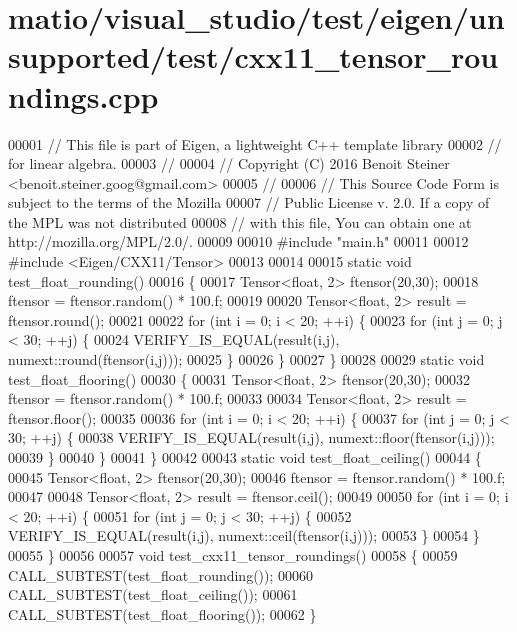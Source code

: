 \hypertarget{matio_2visual__studio_2test_2eigen_2unsupported_2test_2cxx11__tensor__roundings_8cpp_source}{}\section{matio/visual\+\_\+studio/test/eigen/unsupported/test/cxx11\+\_\+tensor\+\_\+roundings.cpp}
\label{matio_2visual__studio_2test_2eigen_2unsupported_2test_2cxx11__tensor__roundings_8cpp_source}

\begin{DoxyCode}
00001 \textcolor{comment}{// This file is part of Eigen, a lightweight C++ template library}
00002 \textcolor{comment}{// for linear algebra.}
00003 \textcolor{comment}{//}
00004 \textcolor{comment}{// Copyright (C) 2016 Benoit Steiner <benoit.steiner.goog@gmail.com>}
00005 \textcolor{comment}{//}
00006 \textcolor{comment}{// This Source Code Form is subject to the terms of the Mozilla}
00007 \textcolor{comment}{// Public License v. 2.0. If a copy of the MPL was not distributed}
00008 \textcolor{comment}{// with this file, You can obtain one at http://mozilla.org/MPL/2.0/.}
00009 
00010 \textcolor{preprocessor}{#include "main.h"}
00011 
00012 \textcolor{preprocessor}{#include <Eigen/CXX11/Tensor>}
00013 
00014 
00015 \textcolor{keyword}{static} \textcolor{keywordtype}{void} test\_float\_rounding()
00016 \{
00017   Tensor<float, 2> ftensor(20,30);
00018   ftensor = ftensor.random() * 100.f;
00019 
00020   Tensor<float, 2> result = ftensor.round();
00021 
00022   \textcolor{keywordflow}{for} (\textcolor{keywordtype}{int} i = 0; i < 20; ++i) \{
00023     \textcolor{keywordflow}{for} (\textcolor{keywordtype}{int} j = 0; j < 30; ++j) \{
00024       VERIFY\_IS\_EQUAL(result(i,j), numext::round(ftensor(i,j)));
00025     \}
00026   \}
00027 \}
00028 
00029 \textcolor{keyword}{static} \textcolor{keywordtype}{void} test\_float\_flooring()
00030 \{
00031   Tensor<float, 2> ftensor(20,30);
00032   ftensor = ftensor.random() * 100.f;
00033 
00034   Tensor<float, 2> result = ftensor.floor();
00035 
00036   \textcolor{keywordflow}{for} (\textcolor{keywordtype}{int} i = 0; i < 20; ++i) \{
00037     \textcolor{keywordflow}{for} (\textcolor{keywordtype}{int} j = 0; j < 30; ++j) \{
00038       VERIFY\_IS\_EQUAL(result(i,j), numext::floor(ftensor(i,j)));
00039     \}
00040   \}
00041 \}
00042 
00043 \textcolor{keyword}{static} \textcolor{keywordtype}{void} test\_float\_ceiling()
00044 \{
00045   Tensor<float, 2> ftensor(20,30);
00046   ftensor = ftensor.random() * 100.f;
00047 
00048   Tensor<float, 2> result = ftensor.ceil();
00049 
00050   \textcolor{keywordflow}{for} (\textcolor{keywordtype}{int} i = 0; i < 20; ++i) \{
00051     \textcolor{keywordflow}{for} (\textcolor{keywordtype}{int} j = 0; j < 30; ++j) \{
00052       VERIFY\_IS\_EQUAL(result(i,j), numext::ceil(ftensor(i,j)));
00053     \}
00054   \}
00055 \}
00056 
00057 \textcolor{keywordtype}{void} test\_cxx11\_tensor\_roundings()
00058 \{
00059    CALL\_SUBTEST(test\_float\_rounding());
00060    CALL\_SUBTEST(test\_float\_ceiling());
00061    CALL\_SUBTEST(test\_float\_flooring());
00062 \}
\end{DoxyCode}
